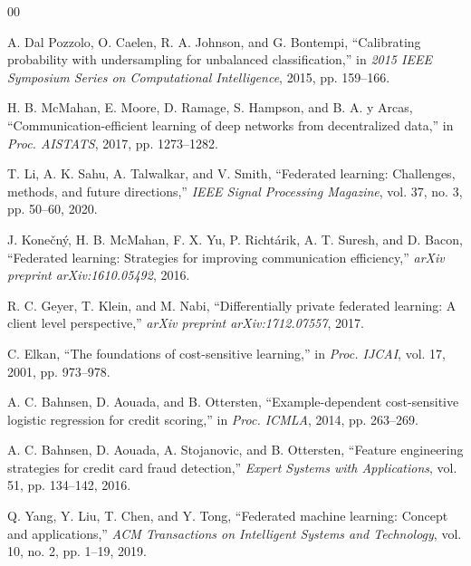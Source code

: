 \documentclass[conference]{IEEEtran}
\begin{document}
\begin{thebibliography}{00}

A. Dal Pozzolo, O. Caelen, R. A. Johnson, and G. Bontempi, ``Calibrating probability with undersampling for unbalanced classification,'' in \textit{2015 IEEE Symposium Series on Computational Intelligence}, 2015, pp. 159--166.

H. B. McMahan, E. Moore, D. Ramage, S. Hampson, and B. A. y Arcas, ``Communication-efficient learning of deep networks from decentralized data,'' in \textit{Proc. AISTATS}, 2017, pp. 1273--1282.

T. Li, A. K. Sahu, A. Talwalkar, and V. Smith, ``Federated learning: Challenges, methods, and future directions,'' \textit{IEEE Signal Processing Magazine}, vol. 37, no. 3, pp. 50--60, 2020.

J. Kone\v{c}n\'y, H. B. McMahan, F. X. Yu, P. Richt\'arik, A. T. Suresh, and D. Bacon, ``Federated learning: Strategies for improving communication efficiency,'' \textit{arXiv preprint arXiv:1610.05492}, 2016.

R. C. Geyer, T. Klein, and M. Nabi, ``Differentially private federated learning: A client level perspective,'' \textit{arXiv preprint arXiv:1712.07557}, 2017.

C. Elkan, ``The foundations of cost-sensitive learning,'' in \textit{Proc. IJCAI}, vol. 17, 2001, pp. 973--978.

A. C. Bahnsen, D. Aouada, and B. Ottersten, ``Example-dependent cost-sensitive logistic regression for credit scoring,'' in \textit{Proc. ICMLA}, 2014, pp. 263--269.

A. C. Bahnsen, D. Aouada, A. Stojanovic, and B. Ottersten, ``Feature engineering strategies for credit card fraud detection,'' \textit{Expert Systems with Applications}, vol. 51, pp. 134--142, 2016.

Q. Yang, Y. Liu, T. Chen, and Y. Tong, ``Federated machine learning: Concept and applications,'' \textit{ACM Transactions on Intelligent Systems and Technology}, vol. 10, no. 2, pp. 1--19, 2019.

\end{thebibliography}
\end{document}
